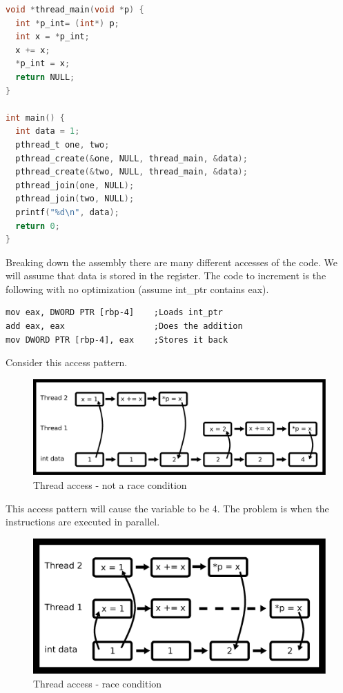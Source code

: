 \begin{lstlisting}[language=C]
void *thread_main(void *p) {
  int *p_int= (int*) p;
  int x = *p_int;
  x += x;
  *p_int = x;
  return NULL;
}

int main() {
  int data = 1;
  pthread_t one, two;
  pthread_create(&one, NULL, thread_main, &data);
  pthread_create(&two, NULL, thread_main, &data);
  pthread_join(one, NULL);
  pthread_join(two, NULL);
  printf("%d\n", data);
  return 0;
}
\end{lstlisting}

Breaking down the assembly there are many different accesses of the code.
We will assume that data is stored in the  register.
The code to increment is the following with no optimization (assume int\_ptr contains eax).

\begin{lstlisting}[language={[x86masm]Assembler}]
mov eax, DWORD PTR [rbp-4]    ;Loads int_ptr
add eax, eax                  ;Does the addition
mov DWORD PTR [rbp-4], eax    ;Stores it back
\end{lstlisting}

Consider this access pattern.

\begin{figure}[H]
\centering
\includegraphics[width=.7\textwidth]{threads/drawings/thread_nonrace_timing.eps}
\caption{Thread access - not a race condition}
\end{figure}

This access pattern will cause the variable  to be 4.
The problem is when the instructions are executed in parallel.

\begin{figure}[H]
\centering
\includegraphics[width=.5\textwidth]{threads/drawings/thread_race_timing.eps}
\caption{Thread access - race condition}
\end{figure}

